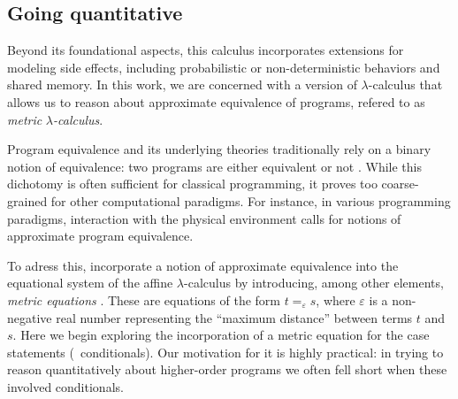 



\subsection*{Going quantitative}

Beyond its foundational aspects, this calculus incorporates extensions for modeling side effects, including probabilistic or non-deterministic behaviors and shared memory. In this work, we are concerned with a version of $\lambda$-calculus that allows us to reason about approximate equivalence of programs, refered to as \emph{metric }$\lambda$\emph{-calculus}.

Program equivalence and its underlying theories traditionally rely on a binary notion of equivalence: two programs are either equivalent or not \cite{winskel93}. While this dichotomy is often sufficient for classical programming, it proves too coarse-grained for other computational paradigms. For instance, in various programming paradigms, interaction with the physical environment calls for notions of approximate program equivalence. 


To adress this, \cite{dahlqvistInternalLanguage2022,dahlqvist2023syntactic} incorporate a notion of approximate equivalence into the equational system of the affine $\lambda$-calculus by introducing, among other elements, \emph{metric equations} \cite{mardare2016quantitative, mardare2017axiomatizability}. These are equations of the form $t =_{\varepsilon} s$, where $\varepsilon$ is a non-negative real number representing the ``maximum distance'' between terms $t$ and $s$. Here we begin exploring the incorporation of a metric equation for the case statements (\ie\ conditionals). Our motivation for it is highly practical: in trying to reason quantitatively about higher-order programs we often fell short when these involved conditionals.

